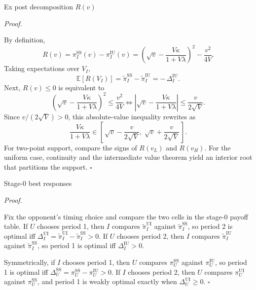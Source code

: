 \documentclass[10pt]{beamer}
\newcommand{\E}{\mathbb{E}}
\newcommand{\pt}{\widetilde{\pi}}
\newcommand{\rSS}{\mathrm{SS}}
\newcommand{\rUI}{\mathrm{UI}}
\newcommand{\rIU}{\mathrm{IU}}
\renewenvironment{proof}{%
  \par\smallskip\noindent\textit{Proof.}\hspace{0.6em}\ignorespaces
}{%
  \unskip\nobreak\hfill$\square$\par\smallskip
}
\begin{document}
\begin{frame}[allowframebreaks]{Ex post decomposition $R(v)$}\label{prf:rv}
  \begin{proof}
    By definition,
    \[
      R(v) = \pi_I^{\rSS}(v) - \pi_I^{\rIU}(v)
           = \left( \sqrt{v} - \dfrac{V\kappa}{1+V\lambda} \right)^{2}
             - \dfrac{v^2}{4V}.
    \]
    Taking expectations over $V_I$,
    \[
      \E\!\left[R(V_I)\right]
      = \pt_I^{\rSS} - \pt_I^{\rIU}
      = -\,\Delta_I^{\rIU}.
    \]
    Next, $R(v)\le 0$ is equivalent to
    \[
      \left( \sqrt{v} - \dfrac{V\kappa}{1+V\lambda} \right)^{2}
      \le \dfrac{v^2}{4V}
      \iff
      \left| \sqrt{v} - \dfrac{V\kappa}{1+V\lambda} \right|
      \le \dfrac{v}{2\sqrt{V}} .
    \]
    Since $v/(2\sqrt{V})>0$, this absolute-value inequality rewrites as
    \[
      \dfrac{V\kappa}{1+V\lambda}
      \in
      \left[\, \sqrt{v} - \dfrac{v}{2\sqrt{V}},\;
               \sqrt{v} + \dfrac{v}{2\sqrt{V}} \,\right].
    \]
    For two-point support, compare the signs of $R(v_L)$ and $R(v_H)$.
    For the uniform case, continuity and the intermediate value theorem
    yield an interior root that partitions the support.
  \end{proof}
\end{frame}

\begin{frame}{Stage-0 best responses}\label{prf:br}
  \begin{proof}
    Fix the opponent's timing choice and compare the two cells in the
    stage-0 payoff table. If $U$ chooses period 1, then $I$ compares
    $\pt_I^{\rUI}$ against $\pt_I^{\rSS}$, so period 2 is optimal iff
    $\Delta_I^{\rUI} = \pt_I^{\rUI} - \pt_I^{\rSS} > 0$. If $U$ chooses
    period 2, then $I$ compares $\pt_I^{\rIU}$ against $\pt_I^{\rSS}$,
    so period 1 is optimal iff $\Delta_I^{\rIU} > 0$.

    Symmetrically, if $I$ chooses period 1, then $U$ compares
    $\pi_U^{\rSS}$ against $\pi_U^{\rIU}$, so period 1 is optimal iff
    $\Delta_U^{\rSS} = \pi_U^{\rSS} - \pi_U^{\rIU} > 0$. If $I$ chooses
    period 2, then $U$ compares $\pi_U^{\rUI}$ against $\pi_U^{\rSS}$,
    and period 1 is weakly optimal exactly when
    $\Delta_U^{\rUI} \ge 0$.
  \end{proof}
\end{frame}
\end{document}
